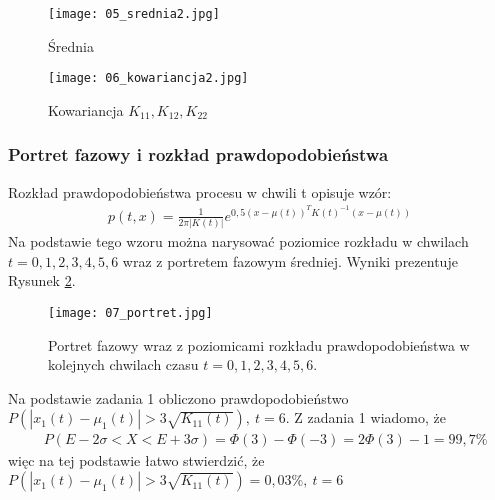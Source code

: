 \documentclass[a4paper,15pt]{article}
\begin{document}
\begin{figure}[H]
  \begin{minipage}[b]{0.45\textwidth}
    \texttt{[image: 05\_srednia2.jpg]}
    \caption{Średnia}
    \label{fig:05_srednia2}
  \end{minipage}
  \begin{minipage}[b]{0.45\textwidth}
    \texttt{[image: 06\_kowariancja2.jpg]}
    \caption{Kowariancja \( K_{11}, K_{12}, K_{22} \) } 
    \label{fig:06_kowariancja2}
  \end{minipage}
\end{figure}

\subsubsection{Portret fazowy i rozkład prawdopodobieństwa}
Rozkład prawdopodobieństwa procesu w chwili t opisuje wzór:
\begin{align*}
p(t,x) = \frac{1}{2\pi|K(t)|}e^{0,5(x-\mu(t))^TK(t)^{-1}(x-\mu(t))}
\end{align*}
Na podstawie tego wzoru można narysować poziomice rozkładu w chwilach \( t = 0,1,2,3,4,5,6 \) wraz z portretem fazowym średniej. Wyniki prezentuje Rysunek \ref{fig:07_portret}.

\begin{figure}[H]
\centerline{\texttt{[image: 07\_portret.jpg]}}
\centering
\caption{Portret fazowy wraz z poziomicami rozkładu prawdopodobieństwa w kolejnych chwilach czasu \( t = 0,1,2,3,4,5,6 \). }
\label{fig:07_portret}
\end{figure}

Na podstawie zadania 1 obliczono prawdopodobieństwo \( P(|x_{1}(t)-\mu _1(t)| > 3\sqrt{K_{11}(t)}), \ t=6 \). Z zadania 1 wiadomo, że 
\begin{align*}
& P(  E - 2 \sigma < X < E + 3\sigma ) = \Phi (3) - \Phi (-3) = 2\Phi (3) - 1 = 99,7\%
\end{align*}
więc na tej podstawie łatwo stwierdzić, że \( P(|x_{1}(t)-\mu _1(t)| > 3\sqrt{K_{11}(t)})=0,03\%, \ t=6 \)
\end{document}
